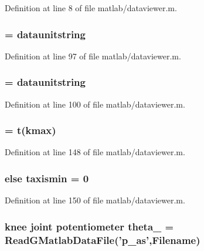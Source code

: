 Definition at line 8 of file matlab/dataviewer.m.
\subsubsection[{T\_\-exec\_\-unitstring}]{ = {\bf dataunitstring}}\label{matlab_2dataviewer_8m_a1ff1ef8d1b44fa3c7f81d5a35256e629}


Definition at line 97 of file matlab/dataviewer.m.
\subsubsection[{t\_\-unitstring}]{ = {\bf dataunitstring}}\label{matlab_2dataviewer_8m_a0bcb68d48a00dcf70f7a4ba91bebad08}


Definition at line 100 of file matlab/dataviewer.m.
\subsubsection[{taxismax}]{ = {\bf t}(kmax)}\label{matlab_2dataviewer_8m_a40f83f3ae20b99cae42f7736245dd6b6}


Definition at line 148 of file matlab/dataviewer.m.
\subsubsection[{taxismin}]{\setlength{\rightskip}{0pt plus 5cm}else {\bf taxismin} = 0}\label{matlab_2dataviewer_8m_a6ed4ca490546bf931c9ba98200b3cf5d}


Definition at line 150 of file matlab/dataviewer.m.
\subsubsection[{theta\_\-2}]{\setlength{\rightskip}{0pt plus 5cm}knee joint potentiometer {\bf theta\_} = ReadGMatlabDataFile('p\_\-as',{\bf Filename})}\label{matlab_2dataviewer_8m_a45446811ab9715113cb18d4838cc8e4d}


